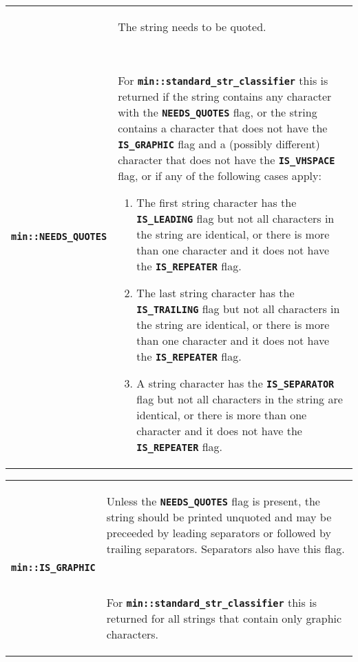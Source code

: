 \documentclass[12pt]{article}
\newcommand{\TT}[1]{{\tt \bfseries #1}}
\newcommand{\EOL}{\penalty \exhyphenpenalty}
\newenvironment{indpar}[1][0.3in]%
	{\begin{list}{}%
		     {\setlength{\itemsep}{0in}%
		      \setlength{\topsep}{0in}%
		      \setlength{\parsep}{1ex}%
		      \setlength{\labelwidth}{#1}%
		      \setlength{\leftmargin}{#1}%
		      \addtolength{\leftmargin}{\labelsep}}%
	 \item}%
	{\end{list}}
\begin{document}
\begin{indpar}\begin{tabular}{p{1.5in}@{~~~}p{4.0in}}
\TT{min::NEEDS\_QUOTES}	& The string needs to be quoted.

			  ~~

			  For \TT{min::\EOL standard\_\EOL str\_\EOL classifier}
			  this is returned if the string contains
			  any character with the \TT{NEEDS\_\EOL QUOTES} flag,
			  or the string contains a character that does not
			  have the \TT{IS\_\EOL GRAPHIC} flag and a (possibly
			  different) character that does not have the
			  \TT{IS\_\EOL VHSPACE} flag,
			  or if any of the following cases apply:

			  \begin{enumerate}
			  \item The first string character has the
			  \TT{IS\_\EOL LEADING} flag but not all characters
			  in the string are identical, or there is more than
			  one character and it does not have the
			  \TT{IS\_\EOL REPEATER} flag.
			  \item The last string character has the
			  \TT{IS\_\EOL TRAILING} flag but not all characters
			  in the string are identical, or there is more than
			  one character and it does not have the
			  \TT{IS\_\EOL REPEATER} flag.
			  \item A string character has the
			  \TT{IS\_\EOL SEPARATOR} flag but not all characters
			  in the string are identical, or there is more than
			  one character and it does not have the
			  \TT{IS\_\EOL REPEATER} flag.
			  \end{enumerate}
\label{NEEDS_QUOTES_CLASSIFIER} \\
\end{tabular}\end{indpar}

\begin{indpar}\begin{tabular}{p{1.5in}@{~~~}p{4.0in}}
\TT{min::IS\_GRAPHIC}	& Unless the \TT{NEEDS\_QUOTES} flag is present,
                          the string should be printed unquoted and may be
                          preceeded by leading separators or followed
			  by trailing separators.  Separators also have
			  this flag.

			  ~~

			  For \TT{min::\EOL standard\_\EOL str\_\EOL classifier}
			  this is returned for all strings that contain only
			  graphic characters.
\label{IS_GRAPHIC_CLASSIFIER} \\
\end{tabular}\end{indpar}
\end{document}
